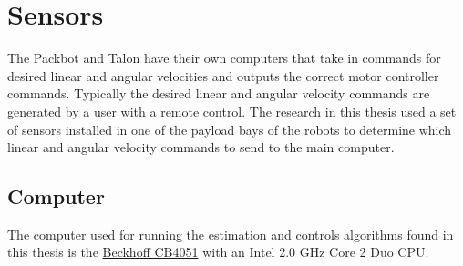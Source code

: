%

\section{Sensors}
\label{sec:bgSensors}
The Packbot and Talon have their own computers that take in commands for desired linear and angular velocities and outputs the correct motor controller commands. Typically the desired linear and angular velocity commands are generated by a user with a remote control. The research in this thesis used a set of sensors installed in one of the payload bays of the robots to determine which linear and angular velocity commands to send to the main computer.

\subsection{Computer}
\label{sec:bgComputer}
The computer used for running the estimation and controls algorithms found in this thesis is the \href{http://www.beckhoff.com/english.asp?motherboards/cb4051.htm}{Beckhoff CB4051} with an Intel 2.0 GHz Core 2 Duo CPU.


